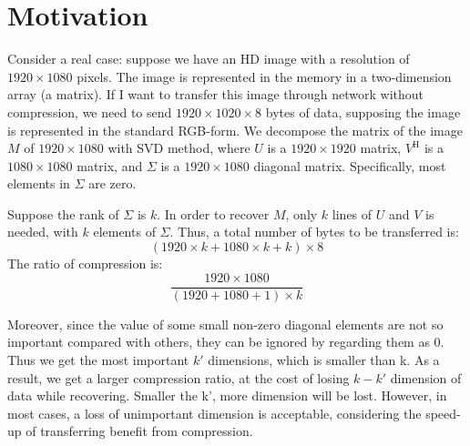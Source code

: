 \documentclass{article}
\begin{document}
    \section{Motivation}
        \par
        Consider a real case:
        suppose we have an HD image with a resolution of $1920 \times 1080$ pixels.
        The image is represented in the memory in a two-dimension array (a matrix).
        If I want to transfer this image through network without compression,
        we need to send $1920 \times 1020 \times 8$ bytes of data,
        supposing the image is represented in the standard RGB-form.
        We decompose the matrix of the image $M$ of $1920 \times 1080$ with SVD method,
        where $U$ is a $1920 \times 1920$ matrix,
        $V^\mathrm{ H }$ is a $1080 \times 1080$ matrix,
        and $\Sigma$ is a $1920 \times 1080$ diagonal matrix.
        Specifically, most elements in $\Sigma$ are zero.
        \par
        Suppose the rank of $\Sigma$ is $k$.
        In order to recover $M$, only $k$ lines of $U$ and $V$ is needed,
        with $k$ elements of $\Sigma$.
        Thus, a total number of bytes to be
        transferred is: $$(1920 \times k + 1080 \times k + k) \times 8$$
        The ratio of compression is: $$\frac{1920 \times 1080}{(1920 + 1080 + 1) \times k} $$
        \par
        Moreover, since the value of some small non-zero diagonal elements are not so important
        compared with others, they can be ignored by regarding them as 0.
        Thus we get the most important $k'$ dimensions, which is smaller than k.
        As a result, we get a larger compression ratio,
        at the cost of losing $k - k'$ dimension of data while recovering.
        Smaller the k’, more dimension will be lost.
        However, in most cases, a loss of unimportant dimension is acceptable,
        considering the speed-up of transferring benefit from compression.
    
\end{document}

